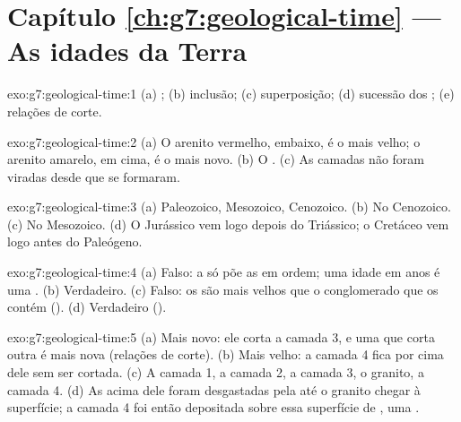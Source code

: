 \section*{Capítulo \ref{ch:g7:geological-time} --- As idades da Terra}

\begin{solution}{exo:g7:geological-time:1}
(a) ; (b) inclusão; (c) superposição; (d) sucessão dos
; (e) relações de corte.
\end{solution}

\begin{solution}{exo:g7:geological-time:2}
(a) O arenito vermelho, embaixo, é o mais velho; o arenito amarelo, em
cima, é o mais novo. (b) O . (c) As camadas não
foram viradas desde que se formaram.
\end{solution}

\begin{solution}{exo:g7:geological-time:3}
(a) Paleozoico, Mesozoico, Cenozoico. (b) No Cenozoico. (c) No
Mesozoico. (d) O Jurássico vem logo depois do Triássico; o Cretáceo vem
logo antes do Paleógeno.
\end{solution}

\begin{solution}{exo:g7:geological-time:4}
(a) Falso: a  só põe as  em ordem; uma idade em
anos é uma . (b) Verdadeiro. (c) Falso: os  são mais
velhos que o conglomerado que os contém ().
(d) Verdadeiro ().
\end{solution}

\begin{solution}{exo:g7:geological-time:5}
(a) Mais novo: ele corta a camada 3, e uma  que corta outra é mais
nova (relações de corte). (b) Mais velho: a camada 4 fica por cima dele
sem ser cortada. (c) A camada 1, a camada 2, a camada 3, o granito, a
camada 4. (d) As  acima dele foram desgastadas pela  até o
granito chegar à superfície; a camada 4 foi então depositada sobre essa
superfície de , uma .
\end{solution}

